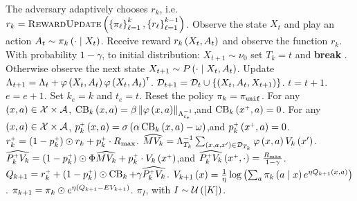 \begin{algorithm}[!h]
\begin{algorithmic}[1]
      \STATE \vspace{3pt}
      \STATE The adversary adaptively chooses $r_k$, i.e.  $r_k = \textsc{RewardUpdate} \left( \left\{ \pi_\ell \right\}^k_{\ell=1}, \left\{ r_\ell \right\}^{k-1}_{\ell=1} \right)$.
      \WHILE{\TRUE}
      \STATE Observe the state $X_t$ and play an action $A_t \sim \pi_k \left( \cdot \mathrel{}\middle|\mathrel{} X_t \right)$.
      \STATE Receive reward $r_k \left( X_t, A_t \right)$ and observe the function $r_k$.
      \STATE With probability $1 - \gamma$, \reset to initial distribution: $X_{t+1} \sim \nu_0$ set $T_k = t$ and \textbf{break} .
      \STATE Otherwise observe the next state $X_{t+1} \sim P \left( \cdot \mathrel{}\middle|\mathrel{} X_t, A_t \right)$.
      \STATE Update $\Lambda_{t + 1} = \Lambda_t + \varphi \left( X_t, A_t \right) \varphi \left( X_t, A_t \right)^\mathsf{\scriptscriptstyle T}$.
      \STATE $\mathcal{D}_{t+1} = \mathcal{D}_t \cup \left\{ \left( X_t, A_t, X_{t+1} \right) \right\}$.
      \STATE $t = t + 1$.
      \ENDWHILE
      \STATE {}
       \label{line-alg:epoch}
      \STATE $e = e + 1$.
      \STATE Set $k_e = k$ and $t_e = t$.
      \STATE Reset the policy $\pi_k = \pi_{\texttt{unif}}$.
      \ENDIF
      \STATE For any $\left( x, a \right) \in \mathcal{X} \times \mathcal{A}$, $\operatorname{CB}_k \left( x, a \right) = \beta \left\|\varphi \left( x, a \right)\right\|_{\Lambda_{t_e}^{-1}}$,\;\;and\; $\operatorname{CB}_k\left( x^{\mathsf{\scriptscriptstyle +}}, a \right) = 0$. \label{line-alg:bonuses}
      \STATE For any $\left( x, a \right) \in \mathcal{X} \times \mathcal{A}$, $p_k^{\mathsf{\scriptscriptstyle +}} \left( x, a \right) = \sigma \left( \alpha \operatorname{CB}_k \left( x, a \right) - \omega \right)$,\;\;and\; $p_k^{\mathsf{\scriptscriptstyle +}} \left( x^{\mathsf{\scriptscriptstyle +}}, a \right) = 0$. \label{line-alg:pplus}
      \STATE {}
      \STATE $r_k^{\mathsf{\scriptscriptstyle +}} = \left( 1 - p_k^{\mathsf{\scriptscriptstyle +}} \right) \odot r_k + p_k^{\mathsf{\scriptscriptstyle +}} \cdot R_{\max}$.
      \STATE $\widehat{M V_k} = \Lambda_{T_k}^{-1} \sum_{\left( x, a, x' \right) \in \mathcal{D}_{T_k}} \varphi \left( x, a \right) V_k \left( x' \right)$. \label{line-alg:ridge}
      \STATE $\widehat{P_k^{\mathsf{\scriptscriptstyle +}} V_k} = \left( 1 - p_k^{\mathsf{\scriptscriptstyle +}} \right) \odot \Phi \widehat{M V_k} + p_k^{\mathsf{\scriptscriptstyle +}} \cdot V_k \left( x^{\mathsf{\scriptscriptstyle +}} \right)$,\;\;and\; $\widehat{P_k^{\mathsf{\scriptscriptstyle +}} V_k} \left( x^{\mathsf{\scriptscriptstyle +}}, \cdot \right) = \frac{R_{\max}}{1 - \gamma}$. \label{line-alg:transf}
      \STATE $Q_{k + 1} = r_k^{\mathsf{\scriptscriptstyle +}} + \left( 1 - p_k^{\mathsf{\scriptscriptstyle +}} \right) \odot \operatorname{CB}_k + \gamma \widehat{P_k^{\mathsf{\scriptscriptstyle +}} V_k}$.
      \STATE $V_{k+1} \left( x \right) = \frac1\eta \log \left( \sum_a \pi_{k} \left( a \mathrel{}\middle|\mathrel{} x \right) e^{\eta Q_{k+1} \left( x, a \right)} \right)$.
      \STATE $\pi_{k+1} = \pi_{k} \odot e^{\eta \left( Q_{k+1} - E V_{k+1} \right)}$.
      \ENDFOR
       $\pi_I$, with $I \sim \mathcal{U} \left( \left[ K \right] \right)$.
  \end{algorithmic}
\end{algorithm}

